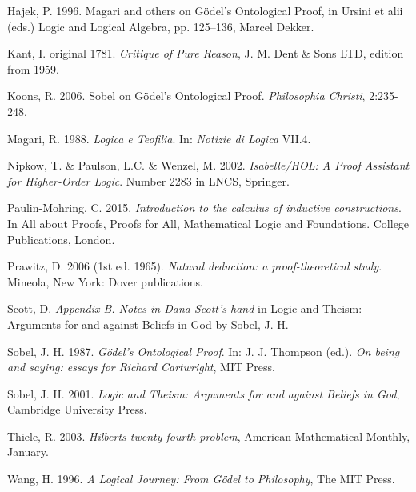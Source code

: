 \documentclass[smallextended]{svjour3}
\begin{document}
\begin{thebibliography}{9}
Hajek, P. 1996. Magari and others on G\"odel's Ontological Proof, in Ursini et alii
(eds.) Logic and Logical Algebra, pp. 125--136, Marcel Dekker.

Kant, I.  original 1781. {\itshape Critique of Pure Reason}, J. M. Dent \& Sons LTD, edition from 1959.

Koons, R. 2006. Sobel on G\"odel's Ontological Proof. {\itshape Philosophia Christi}, 2:235-248.

Magari, R. 1988. {\itshape Logica e Teofilia}. In: {\itshape Notizie di Logica} VII.4.


 Nipkow, T. \& Paulson, L.C. \& Wenzel, M. 2002. {\itshape Isabelle/HOL: A Proof Assistant for
Higher-Order Logic}. Number 2283 in LNCS, Springer.

 Paulin-Mohring, C. 2015. {\itshape Introduction to the calculus of inductive constructions}. In %
All about Proofs, Proofs for All,
Mathematical Logic and Foundations. College Publications, London.

Prawitz, D. 2006 (1st ed. 1965). {\itshape Natural deduction: a proof-theoretical study}. Mineola, New York: Dover publications. 

Scott, D. {\itshape Appendix B. Notes in Dana Scott's hand} in Logic and Theism: Arguments for and against Beliefs in God by Sobel, J. H. 

Sobel, J. H. 1987. {\itshape G\"odel's Ontological Proof}. In: J. J. Thompson (ed.). {\itshape On being and saying: essays for Richard Cartwright},  MIT Press. 

Sobel, J. H. 2001. {\itshape Logic and Theism: Arguments for and against Beliefs in God}, Cambridge University Press. 

 Thiele, R. 2003. {\itshape Hilberts twenty-fourth problem}, American Mathematical Monthly, January. 

Wang, H. 1996. {\itshape A Logical Journey: From G\"odel to Philosophy}, The MIT Press. 


\end{thebibliography}
\end{document}
